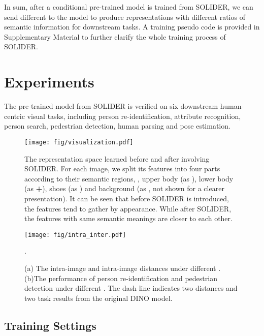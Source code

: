 \documentclass[10pt,twocolumn,letterpaper]{article}
\begin{document}
In sum, after a conditional pre-trained model is trained from SOLIDER, we can send different   to the model to produce representations with different ratios of semantic information for downstream tasks. 
A training pseudo code is provided in Supplementary Material to further clarify the whole training process of SOLIDER.

\section{Experiments}
The pre-trained model from SOLIDER is verified on six downstream human-centric visual tasks, including person re-identification, attribute recognition, person search, pedestrian detection, human parsing and pose estimation. 

\begin{figure*}[!t]
\centering
\texttt{[image: fig/visualization.pdf]}
\vspace{-0.7cm}
\caption{The representation space learned before and after involving SOLIDER. For each image, we split its features into four parts according to their semantic regions, \ie, upper body (as ), lower body (as \textbf{+}), shoes (as ) and background (as \textbf{}, not shown for a clearer presentation). It can be seen that before SOLIDER is introduced, the features tend to gather by appearance. While after SOLIDER, the features with same semantic meanings are closer to each other.}
\label{fig:visual}
\vspace{-0.3cm}
\end{figure*}

\begin{figure}[!t]
\centering
\texttt{[image: fig/intra\_inter.pdf]}
\vspace{-0.4cm}
\caption{(a) The intra-image and intra-image distances under different . (b)The performance of person re-identification and pedestrian detection under different . The dash line indicates two distances and two task results from the original DINO model.}.
\label{fig:analysis}
\vspace{-0.6cm}
\end{figure}

\subsection{Training Settings}
\end{document}
